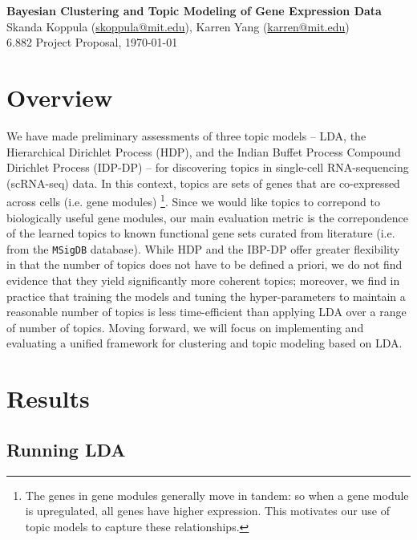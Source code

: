 \documentclass[11pt]{article}
\begin{document}
\begin{centering}
\Large
    \textbf{Bayesian Clustering and Topic Modeling of Gene Expression Data}  \\
    \vspace{2mm}
    \normalsize
    Skanda Koppula (\url{skoppula@mit.edu}), Karren Yang (\url{karren@mit.edu}) \\
    \vspace{2mm}
    \normalsize
    6.882 Project Proposal, \today \\
\end{centering}
\vspace{5mm}

\section{Overview}

We have made preliminary assessments of three topic models -- LDA, the Hierarchical Dirichlet Process (HDP), and the Indian Buffet Process Compound Dirichlet Process (IDP-DP) -- for discovering topics in single-cell RNA-sequencing (scRNA-seq) data. In this context, topics are sets of genes that are co-expressed across cells (i.e. gene modules) \footnote{The genes in gene modules generally move in tandem: so when a gene module is upregulated, all genes have higher expression. This motivates our use of topic models to capture these relationships.}. Since we would like topics to correpond to biologically useful gene modules, our main evaluation metric is the correpondence of the learned topics to known functional gene sets curated from literature (i.e. from the \texttt{MSigDB} database). While HDP and the IBP-DP offer greater flexibility in that the number of topics does not have to be defined a priori, we do not find evidence that they yield significantly more coherent topics; moreover, we find in practice that training the models and tuning the hyper-parameters to maintain a reasonable number of topics is less time-efficient than applying LDA over a range of number of topics. Moving forward, we will focus on implementing and evaluating a unified framework for clustering and topic modeling based on LDA. 

\section{Results}
\subsection*{Running LDA}
\end{document}
